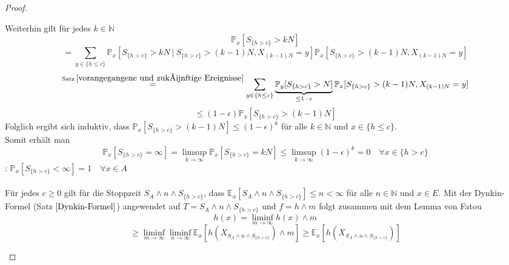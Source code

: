 \documentclass[a4paper,12pt]{scrartcl}
\theoremstyle{definition}
\begin{document}
\begin{proof}
\begin{itemize}
\begin{equation*}
\end{equation*}
Weiterhin gilt für jedes $k \in \mathbb{N}$
\begin{equation*}
\mathbb{P}_{x}[S_{\lbrace h > c \rbrace}> kN]
\end{equation*}
\begin{equation*}
= \sum_{y \in {\lbrace h \leq c \rbrace}} \mathbb{P}_{x}[S_{\lbrace h > c \rbrace}> kN \: | \: S_{\lbrace h > c \rbrace} > (k-1)N, X_{(k-1)N}=y] \mathbb{P}_{x}[S_{\lbrace h > c \rbrace} > (k-1)N, X_{(k-1)N}=y]
\end{equation*}
\begin{equation*}
\stackrel{\mathrm{Satz} \: \ref{vorangegangene und zukünftige Ereignisse}}{=} \sum_{y \in {\lbrace h \leq c \rbrace}} \underbrace{\mathbb{P}_{y}[S_{\lbrace h > c \rbrace}> N]}_{\leq 1 - \epsilon} \mathbb{P}_{x}[S_{\lbrace h > c \rbrace} > (k-1)N, X_{(k-1)N}=y]
\end{equation*}
\begin{equation*}
\leq (1-\epsilon) \mathbb{P}_{x}[S_{\lbrace h > c \rbrace} > (k-1)N]
\end{equation*}
Folglich ergibt sich induktiv, dass $\mathbb{P}_{x}[S_{\lbrace h > c \rbrace} > (k-1)N] \leq (1-\epsilon)^{k}$ für alle $k \in \mathbb{N}$ und $x \in \lbrace h \leq c \rbrace$.
\\
Somit erhält man 
\begin{equation*}
\mathbb{P}_{x}[S_{\lbrace h > c \rbrace} = \infty] = \limsup_{k \to \infty} \mathbb{P}_{x}[S_{\lbrace h > c \rbrace} = kN] \leq \limsup_{k \to \infty} (1-\epsilon)^{k} = 0 \quad \forall x \in {\lbrace h > c \rbrace}
\end{equation*}
: $\mathbb{P}_{x}[S_{\lbrace h > c \rbrace} < \infty] = 1 \quad \forall x \in A$
\\
\\
Für jedes $c \geq 0$ gilt für die Stoppzeit $S_{A} \wedge n \wedge S_{{\lbrace h > c \rbrace}}$, dass $\mathbb{E}_{x}[S_{A} \wedge n \wedge S_{{\lbrace h > c \rbrace}}] \leq n < \infty$ für alle $n \in \mathbb{N}$ und $x \in E$. Mit der Dynkin-Formel (Satz $\ref{Dynkin-Formel}$) angewendet auf $T=S_{A} \wedge n \wedge S_{{\lbrace h > c \rbrace}}$ und $f = h \wedge m$ folgt zusammen mit dem Lemma von Fatou
\begin{equation*}
h(x) = \liminf_{m \to \infty} h(x) \wedge m
\end{equation*} 
\begin{equation*}
\geq \liminf_{m \to \infty} \liminf_{n \to \infty} \mathbb{E}_{x}[h(X_{S_{A} \wedge n \wedge S_{\lbrace h > c \rbrace}} ) \wedge m] \geq \mathbb{E}_{x}[h(X_{S_{A} \wedge n \wedge S_{\lbrace h > c \rbrace}} )]

\end{equation*}
\end{itemize}
\end{proof}
\end{document}
